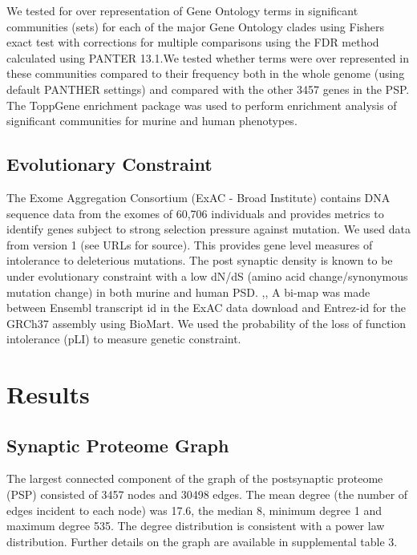  We tested for over representation of Gene Ontology terms in significant communities (sets) for each of the major Gene Ontology clades using Fishers exact test with corrections for multiple comparisons using the FDR method calculated using PANTER 13.1.\cite{mi2013large}We tested whether terms were over represented in these communities compared to their frequency both in the whole genome (using default  PANTHER settings) and compared with the  other 3457 genes in the PSP. \cite{mi2013large}  The ToppGene enrichment package was used to perform enrichment analysis of significant communities for murine and human phenotypes. \cite{chen2009toppgene}  

\subsection{Evolutionary Constraint}

The Exome Aggregation Consortium (ExAC - Broad Institute) contains DNA sequence data from the exomes of 60,706 individuals and provides metrics to identify genes subject to strong selection pressure against mutation. \cite{lek2016analysis}  We used data from version 1 (see URLs for source). This provides gene level measures of intolerance to deleterious mutations. The post synaptic density is known to be under evolutionary constraint with a low dN/dS (amino acid change/synonymous mutation change) in both murine and human PSD. \cite{ryan2009origin},\cite{bayes2012comparative},\cite{bayes2011characterization}  A bi-map was made between Ensembl transcript id in the ExAC data download and Entrez-id for the GRCh37 assembly using BioMart. \cite{smedley2015biomart}  We used the probability of the loss of function intolerance (pLI) to measure genetic constraint.



\section{Results}

\subsection{Synaptic Proteome Graph}

The largest connected component of the graph of the postsynaptic proteome (PSP) consisted of 3457 nodes and 30498 edges. The mean degree (the number of edges incident to each node) was 17.6, the median 8, minimum degree 1 and maximum degree 535. The degree distribution is consistent with a power law distribution. Further details on the graph are available in supplemental table 3. 
